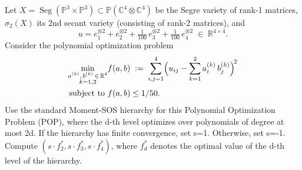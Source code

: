 Let $X = \operatorname{Seg}(\mathbb{P}^3 \times \mathbb{P}^3)
\subset \mathbb{P}(\mathbb{C}^4 \otimes \mathbb{C}^4)$ be the Segre variety of rank-1 matrices, $\sigma_2(X)$ its 2nd secant variety (consisting of rank-2 matrices), and
\[
  u = e_1^{\otimes 2} + e_2^{\otimes 2} + \tfrac{1}{100}\,e_3^{\otimes 2}
      + \tfrac{1}{100}\, e_4^{\otimes 2}
  \;\in\; \mathbb{R}^{4 \times 4}.
\]
Consider the polynomial optimization problem
\begin{align}
  \min_{\substack{a^{(k)},\, b^{(k)}\,\in\,\mathbb{R}^4\\k=1,2}}
  &f(a,b)
  \;:=\;
  \sum_{i,j=1}^{4}
  \Bigl(
    u_{ij}
    - \sum_{k=1}^{2} a^{(k)}_i\, b^{(k)}_j
  \Bigr)^{\!2}\\
  \text{subject to } &f(a,b) \le 1/50.
\end{align}
Use the standard Moment-SOS hierarchy for this Polynomial Optimization Problem (POP), where the d-th level optimizes over polynomials of degree at most 2d. If the hierarchy has finite convergence, set s=1. Otherwise, set s=-1. Compute $(s\cdot f_2^*, s\cdot f_3^*, s\cdot f_4^*)$, where $f_{d}^*$ denotes the optimal value of the d-th level of the hierarchy.
